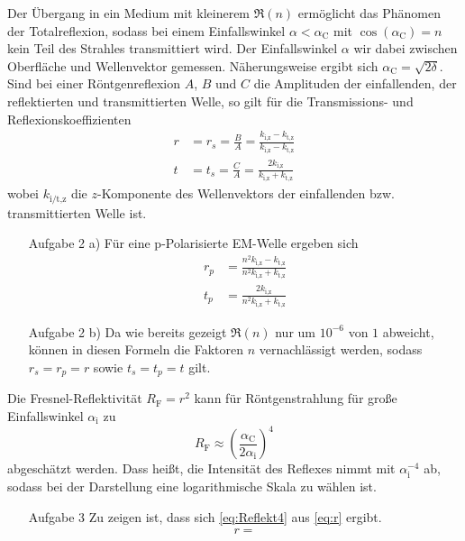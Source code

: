 Der Übergang in ein Medium mit kleinerem $\Re(n)$ ermöglicht das Phänomen der 
Totalreflexion, sodass bei einem Einfallswinkel $\alpha < \alpha_\text{C}$ mit 
$\cos(\alpha_\text{C})=n$ kein Teil des Strahles transmittiert wird. Der 
Einfallswinkel $\alpha$ wir dabei zwischen Oberfläche und Wellenvektor gemessen. 
Näherungsweise ergibt sich $\alpha_\text{C}=\sqrt{2\delta}$.\\
Sind bei einer Röntgenreflexion $A$, $B$ und $C$ die Amplituden der 
einfallenden, der reflektierten und transmittierten Welle, so gilt für die 
Transmissions- und Reflexionskoeffizienten
\begin{align}
r&=r_s=\frac{B}{A}=\frac{k_\text{i,z}-k_\text{t,z}}{k_\text{i,z}-k_\text{t,z}} \label{eq:r} \\
t&=t_s=\frac{C}{A}= \frac{2 k_\text{i,z}}{k_\text{i,z}+k_\text{t,z}}
\end{align}
wobei $k_\text{i/t,z}$ die $z$-Komponente des Wellenvektors der einfallenden 
bzw. transmittierten Welle ist.
\begin{itemize}
\item[Aufgabe 2 a)] 
Für eine p-Polarisierte EM-Welle ergeben sich 
\begin{align}
r_p&= \frac{n^2 k_\text{i,z}-k_\text{t,z}}{n^2 k_\text{i,z}+k_\text{t,z}} \\
t_p&=\frac{2k_\text{i,z}}{n^2 k_\text{i,z}+k_\text{t,z}}
\end{align}
\item[Aufgabe 2 b)]
Da wie bereits gezeigt $\Re(n)$ nur um $10^{-6}$ von $1$ abweicht, können in 
diesen Formeln die Faktoren $n$ vernachlässigt werden, sodass $r_s=r_p=r$ sowie 
$t_s=t_p=t$ gilt.
\end{itemize}
Die Fresnel-Reflektivität $R_\text{F}=r^2$ kann für Röntgenstrahlung für große 
Einfallswinkel $\alpha_\text{i}$ zu 
\begin{equation}
R_\text{F}\approx \left( \frac{\alpha_\text{C}}{2\alpha_\text{i}} \right)^4 \label{eq:Reflekt4}
\end{equation}
abgeschätzt werden. Dass heißt, die Intensität des Reflexes nimmt mit 
$\alpha_\text{i}^{-4}$ ab, sodass bei der Darstellung eine logarithmische Skala 
zu wählen ist.
\begin{itemize}
\item[Aufgabe 3]
Zu zeigen ist, dass sich \eqref{eq:Reflekt4} aus \eqref{eq:r} ergibt.
\begin{align*}
r=
\end{align*}
\end{itemize}
